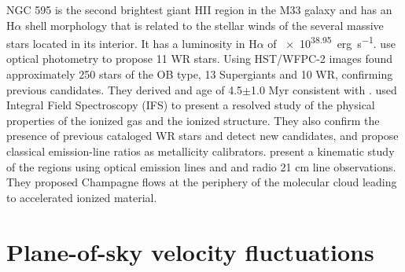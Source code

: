 \documentclass[fleqn,usenatbib, useAMS, a4paper]{mnras}
\newcommand\ha{\ensuremath{\text{H}\alpha}}
\begin{document}
NGC 595 is the second brightest giant HII region in the M33 galaxy and has an \ha{} shell morphology that is related to the stellar winds of the several massive stars located in its interior.
It has a luminosity in \ha{} of \SI{e38.95}{erg.s^{-1}}\citep{2002MNRAS.329..481B}.
\citet{1993AJ....105.1400D} use optical photometry to propose 11 WR stars. 
Using HST/WFPC-2 images \citet{1996AJ....111.1128M} found approximately 250 stars of the OB type, 13 Supergiants and 10 WR, confirming previous candidates.
They derived and age of 4.5\(\pm\)1.0 Myr consistent with \citet{1993AJ....105.1400D}.
\citet{2010MNRAS.402.1635R} used Integral Field Spectroscopy (IFS) to present a resolved study of the physical properties of the ionized gas and the ionized structure.
They also confirm the presence of previous cataloged WR stars and detect new candidates, and propose classical emission-line ratios as metallicity calibrators.
\citet{lagrois2011} present a kinematic study of the regions using optical emission lines and and radio 21 cm line observations.
They proposed Champagne flows at the periphery of the molecular cloud leading to accelerated ionized material.



\section{Plane-of-sky velocity fluctuations}\label{sec:met}


\end{document}
